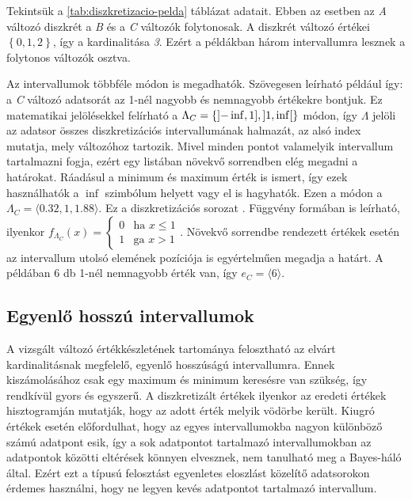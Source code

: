 Tekintsük a \ref{tab:diszkretizacio-pelda} táblázat adatait. Ebben az esetben az \emph{A} változó diszkrét a \emph{B} és a \emph{C} változók folytonosak. A diszkrét változó értékei $\left\{ 0, 1, 2 \right\}$, így a kardinalitása \emph{3}. Ezért a példákban három intervallumra lesznek a folytonos változók osztva.

Az intervallumok többféle módon is megadhatók. Szövegesen leírható például így: a \emph{C} változó adatsorát az 1-nél nagyobb és nemnagyobb értékekre bontjuk. Ez matematikai jelölésekkel felírható a $\Lambda_{C} = \left\{ \interval[open left]{-\inf}{1}, \interval[open]{1}{\inf} \right\} $ módon, így $\Lambda$ jelöli az adatsor összes diszkretizációs intervallumának halmazát, az alsó index mutatja, mely változóhoz tartozik. Mivel minden pontot valamelyik intervallum tartalmazni fogja, ezért egy listában növekvő sorrendben elég megadni a határokat. Ráadásul a minimum és maximum érték is ismert, így ezek használhatók a $\inf$ szimbólum helyett vagy el is hagyhatók. Ezen a módon a $\Lambda_{C} = \langle 0.32, 1, 1.88 \rangle$. Ez a diszkretizációs sorozat \cite{friedman1996discretizing}. Függvény formában is leírható, ilyenkor
$f_{\Lambda_{C}}(x) = \left\{ \begin{array}{ll}
    0 & \mbox{ha } x \leq 1 \\
    1 & \mbox{ga } x > 1
\end{array} \right.$. Növekvő sorrendbe rendezett értékek esetén az intervallum utolsó elemének pozíciója is egyértelműen megadja a határt. A példában 6 db 1-nél nemnagyobb érték van, így $e_{C} = \langle 6 \rangle$.

\subsection{Egyenlő hosszú intervallumok}
A vizsgált változó értékkészletének tartománya felosztható az elvárt kardinalitásnak megfelelő, egyenlő hosszúságú intervallumra. Ennek kiszámolásához csak egy maximum és minimum keresésre van szükség, így rendkívül gyors és egyszerű. A diszkretizált értékek ilyenkor az eredeti értékek hisztogramján mutatják, hogy az adott érték melyik vödörbe került. Kiugró értékek esetén előfordulhat, hogy az egyes intervallumokba nagyon különböző számú adatpont esik, így a sok adatpontot tartalmazó intervallumokban az adatpontok közötti eltérések könnyen elvesznek, nem tanulható meg a Bayes-háló által. Ezért ezt a típusú felosztást egyenletes eloszlást közelítő adatsorokon érdemes használni, hogy ne legyen kevés adatpontot tartalmazó intervallum.

